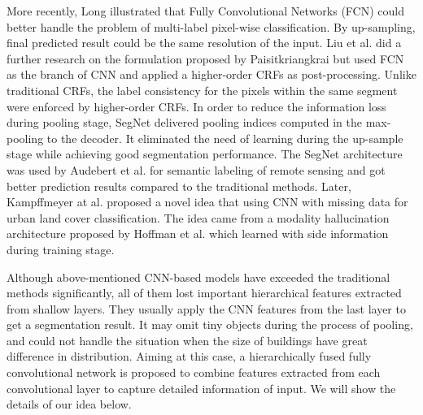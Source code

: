 \setlength{\parindent}{2ex}More recently, Long \cite{IEEEexample:Long_2015_CVPR} illustrated that Fully Convolutional Networks (FCN) could better handle the problem of multi-label pixel-wise classification. By up-sampling, final predicted result could be the same resolution of the input. Liu et al. \cite{IEEEexample:liu2017dense} did a further research on the formulation proposed by Paisitkriangkrai \cite{IEEEexample:paisitkriangkrai2015effective} but used FCN as the branch of CNN and applied a higher-order CRFs as post-processing. Unlike traditional CRFs, the label consistency for the pixels within the same segment were enforced by higher-order CRFs. In order to reduce the information loss during pooling stage, SegNet \cite{IEEEexample:badrinarayanan2017segnet} delivered pooling indices computed in the max-pooling to the decoder. It eliminated the need of learning during the up-sample stage while achieving good segmentation performance. The SegNet architecture was used by Audebert et al. \cite{IEEEexample:audebert2017deep} for semantic labeling of remote sensing and got better prediction results compared to the traditional methods. Later, Kampffmeyer at al. \cite{IEEEexample:kampffmeyer2017urban} proposed a novel idea that using CNN with missing data for urban land cover classification. The idea came from a modality hallucination architecture proposed by Hoffman et al. \cite{IEEEexample:hoffman2016learning} which learned with side information during training stage. 


Although above-mentioned CNN-based models have exceeded the traditional methods significantly, all of them lost important hierarchical features extracted from shallow layers. They usually apply the CNN features from the last layer to get a segmentation result. It may omit tiny objects during the process of pooling, and could not handle the situation when the size of buildings have great difference in distribution. Aiming at this case, a hierarchically fused fully convolutional network is proposed to combine features extracted from each convolutional layer to capture detailed information of input. We will show the details of our idea below.
